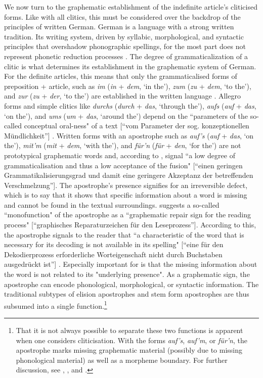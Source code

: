 We now turn to the graphematic establishment of the indefinite article's cliticised forms. 
Like with all clitics, this must be considered over the backdrop of the principles of written German.
German is a language with a strong written tradition. 
Its writing system, driven by syllabic, morphological, and syntactic principles that overshadow phonographic spellings, for the most part does not represent phonetic reduction processes \citep[309]{Eisenberg2013a}.
The degree of grammaticalization of a clitic is what determines its establishment in the graphematic system of German.
For the definite articles, this means that only the grammaticalised forms of preposition + article, such as \textit{im} (\textit{in} + \textit{dem}, `in the'), \textit{zum} (\textit{zu} + \textit{dem}, `to the'), and \textit{zur} (\textit{zu} + \textit{der}, `to the') are established in the written language \citep[304]{Nuebling1992}.
Allegro forms and simple clitics like \textit{durchs} (\textit{durch} + \textit{das}, `through the'), \textit{aufs} (\textit{auf} + \textit{das}, `on the'), and \textit{ums} (\textit{um} + \textit{das}, `around the') depend on the ``parameters of the so-called conceptual oral-ness" of a text [``vom Parameter der sog. konzeptionellen Mündlichkeit''] \citep[305]{Nuebling1992}.
Written forms with an apostrophe such as \textit{auf's} (\textit{auf} + \textit{das}, `on the'), \textit{mit'm} (\textit{mit} + \textit{dem}, `with the'), and \textit{für'n} (\textit{für} + \textit{den}, `for the') are not prototypical graphematic words \citep{Fuhrhop2008} and, according to \citet[308]{Nuebling1992}, signal ``a low degree of grammaticalisation and thus a low acceptance of the fusion" [``einen geringen Grammatikalisierungsgrad und damit eine geringere Akzeptanz der betreffenden Verschmelzung''].
The apostrophe's presence signifies for \citet{Bredel2008,Bredel2011} an irreversible defect, which is to say that it shows that specific information about a word is missing and cannot be found in the textual surroundings.
\citet[103]{Bredel2008} suggests a so-called ``monofunction" of the apostrophe as a ``graphematic repair sign for the reading process" [``graphisches Reparaturzeichen für den Leseprozess''].
According to this, the apostrophe signals to the reader that ``a characteristic of the word that is necessary for its decoding is not available in its spelling" [``eine für den Dekodierprozess erforderliche Worteigenschaft nicht durch Buchstaben ausgedrückt ist''] \citep[42]{Bredel2011}.
Especially important for \citet[43]{Bredel2008} is that the missing information about the word is not related to its "underlying presence".
As a graphematic sign, the apostrophe can encode phonological, morphological, or syntactic information.
The traditional subtypes of elision apostrophes and stem form apostrophes are thus subsumed into a single function.\footnote{
	That it is not always possible to separate these two functions is apparent when one considers cliticisation. With the forms \textit{auf's}, \textit{auf'm}, or \textit{für'n}, the apostrophe marks missing graphematic material (possibly due to missing phonological material) as well as a morpheme boundary. For further discussion, see \citet[307]{Nuebling1992}, \citet[41]{Bredel2011}, and \citet[104]{Bredel2008}.} 

